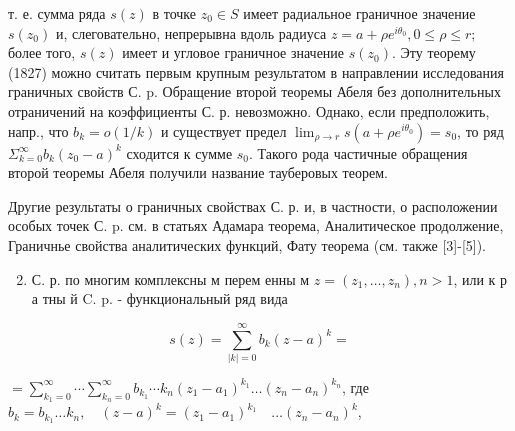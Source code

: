 \documentclass[10pt]{article}
\begin{document}
т. е. сумма ряда $s(z)$ в точке $z_{0} \in S$ имеет радиальное граничное значение $s\left(z_{0}\right)$ и, слеговательно, непрерывна вдоль радиуса $z=a+\rho e^{i \theta_{0}}, 0 \leqslant \rho \leqslant r ;$ более того, $s(z)$ имеет и угловое граничное значение $s\left(z_{0}\right)$. Эту теорему (1827) можно считать первым крупным результатом в направлении исследования граничных свойств С. p. Обращение второй теоремы Абеля без дополнительных отраничений на коэффициенты С. р. невозможно. Однако, если предположить, напр., что $b_{k}=o(1 / k)$ и существует предел $\lim _{\rho \rightarrow r} s\left(a+\rho e^{i \theta_{0}}\right)=s_{0}$, то ряд $\Sigma_{k=0}^{\infty} b_{k}\left(z_{0}-a\right)^{k}$ сходится к сумме $s_{0}$. Такого рода частичные обращения второй теоремы Абеля получили название тауберовых теорем.



Другие результаты о граничных свойствах С. р. и, в частности, о расположении особых точек С. p. см. в статьях Адамара теорема, Аналитическое продолжение, Граничнье свойства аналитических функций, Фату теорема (см. также [3]-[5]).



\begin{enumerate}

  \setcounter{enumi}{1}

  \item С. р. по многим комплексны м перем енны м $z=\left(z_{1}, \ldots, z_{n}\right), n>1$, или к р а тны й C. p. - функциональный ряд вида

\end{enumerate}



\[

s(z)=\sum_{|k|=0}^{\infty} b_{k}(z-a)^{k}=

\]



$=\sum_{k_{1}=0}^{\infty} \cdots \sum_{k_{n}=0}^{\infty} b_{k_{1}} \cdots k_{n}\left(z_{1}-a_{1}\right)^{k_{1}} \ldots\left(z_{n}-a_{n}\right)^{k_{n}}$, где $b_{k}=b_{k_{1}} \ldots k_{n}, \quad(z-a)^{k}=\left(z_{1}-a_{1}\right)^{k_{1}} \quad \ldots\left(z_{n}-a_{n}\right)^{k}$,
\end{document}
